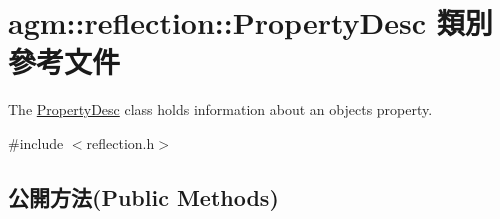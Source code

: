 \hypertarget{classagm_1_1reflection_1_1_property_desc}{}\section{agm\+:\+:reflection\+:\+:Property\+Desc 類別 參考文件}
\label{classagm_1_1reflection_1_1_property_desc}


The \hyperlink{classagm_1_1reflection_1_1_property_desc}{Property\+Desc} class holds information about an object\textquotesingle{}s property.  




{\ttfamily \#include $<$reflection.\+h$>$}

\subsection*{公開方法(Public Methods)}
